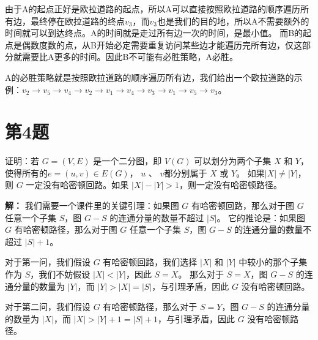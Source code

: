 \documentclass[utf8]{ctexart}
\theoremstyle{mystyle}
\begin{document}
由于A的起点正好是欧拉道路的起点，所以A可以直接按照欧拉道路的顺序遍历所有边，最终停在欧拉道路的终点$v_3$，而$v_3$也是我们的目的地，所以A不需要额外的时间就可以到达终点。A的时间就是走过所有边一次的时间，是最小值。
而B的起点是偶数度数的点，从B开始必定需要重复访问某些边才能遍历完所有边，仅这部分就需要比A更多的时间。因此B不可能有必胜策略，A必胜。

A的必胜策略就是按照欧拉道路的顺序遍历所有边，我们给出一个欧拉道路的示例：$v_2 \to v_5 \to v_4 \to v_2 \to v_1 \to v_4 \to v_3 \to v_1 \to v_5 \to v_3$。

\bigskip
\section*{第4题}
\begin{problembox}
证明：若 $G=(V, E)$ 是一个二分图，即 $V(G)$ 可以划分为两个子集 $X$ 和 $Y$，使得所有的$ e=(u, v) \in E(G)$， $u$ 、 $v$都分别属于 $X$ 或 $Y$。
如果$|X|\neq|Y|$，则 $G$ 一定没有哈密顿回路。如果 $|X|-|Y|>1$，则一定没有哈密顿路径。
\end{problembox}
\textbf{解：} 我们需要一个课件里的关键引理：如果图 $G$ 有哈密顿回路，那么对于图 $G$ 任意一个子集 $S$，图 $G-S$ 的连通分量的数量不超过 $|S|$。
它的推论是：如果图 $G$ 有哈密顿路径，那么对于图 $G$ 任意一个子集 $S$，图 $G-S$ 的连通分量的数量不超过 $|S| + 1$。

对于第一问，我们假设 $G$ 有哈密顿回路，我们选择 $|X|$ 和 $|Y|$ 中较小的那个子集作为 $S$，我们不妨假设 $|X| < |Y|$，因此 $S=X$。
那么对于 $S=X$，图 $G-S$ 的连通分量的数量为 $|Y|$，而 $|Y| > |X| = |S|$，与引理矛盾，因此 $G$ 没有哈密顿回路。

对于第二问，我们假设 $G$ 有哈密顿路径，那么对于 $S=Y$，图 $G-S$ 的连通分量的数量为 $|X|$，而 $|X| > |Y| + 1 = |S| + 1$，与引理矛盾，因此 $G$ 没有哈密顿路径。
\end{document}
